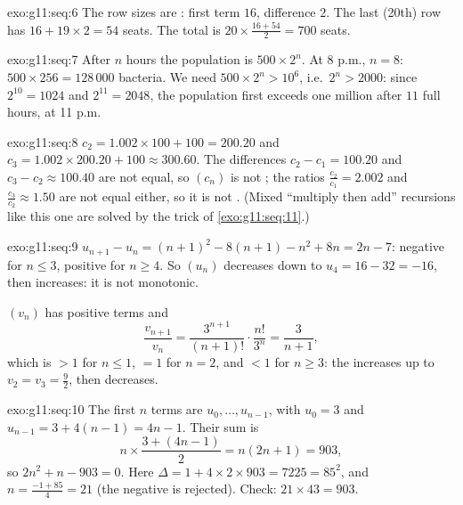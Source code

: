 \begin{solution}{exo:g11:seq:6}
The row sizes are : first term $16$, difference $2$. The last
(20th) row has $16 + 19 \times 2 = 54$ seats. The total is
$20 \times \frac{16 + 54}{2} = 700$ seats.
\end{solution}

\begin{solution}{exo:g11:seq:7}
After $n$ hours the population is $500 \times 2^n$. At 8 p.m., $n = 8$:
$500 \times 256 = 128\,000$ bacteria. We need $500 \times 2^n >
10^6$, i.e.\ $2^n > 2000$: since $2^{10} = 1024$ and $2^{11} = 2048$, the
population first exceeds one million after $11$ full hours, at 11 p.m.
\end{solution}

\begin{solution}{exo:g11:seq:8}
$c_2 = 1.002 \times 100 + 100 = 200.20$ and
$c_3 = 1.002 \times 200.20 + 100 \approx 300.60$. The differences
$c_2 - c_1 = 100.20$ and $c_3 - c_2 \approx 100.40$ are not equal, so
$(c_n)$ is not ; the ratios $\frac{c_2}{c_1} = 2.002$ and
$\frac{c_3}{c_2} \approx 1.50$ are not equal either, so it is not
. (Mixed ``multiply then add'' recursions like this one are
solved by the  trick of \cref{exo:g11:seq:11}.)
\end{solution}

\begin{solution}{exo:g11:seq:9}
$u_{n+1} - u_n = (n+1)^2 - 8(n+1) - n^2 + 8n = 2n - 7$: negative for
$n \leq 3$, positive for $n \geq 4$. So $(u_n)$ decreases down to
$u_4 = 16 - 32 = -16$, then increases: it is not monotonic.

$(v_n)$ has positive terms and
\[
\frac{v_{n+1}}{v_n} = \frac{3^{n+1}}{(n+1)!} \cdot \frac{n!}{3^n}
= \frac{3}{n+1},
\]
which is $> 1$ for $n \leq 1$, $= 1$ for $n = 2$, and $< 1$ for
$n \geq 3$: the  increases up to $v_2 = v_3 = \frac92$, then
decreases.
\end{solution}

\begin{solution}{exo:g11:seq:10}
The first $n$ terms are $u_0, \dots, u_{n-1}$, with $u_0 = 3$ and
$u_{n-1} = 3 + 4(n-1) = 4n - 1$. Their sum is
\[
n \times \frac{3 + (4n-1)}{2} = n(2n + 1) = 903,
\]
so $2n^2 + n - 903 = 0$. Here $\Delta = 1 + 4 \times 2 \times 903 =
7225 = 85^2$, and $n = \frac{-1 + 85}{4} = 21$ (the negative  is
rejected). Check: $21 \times 43 = 903$.
\end{solution}

